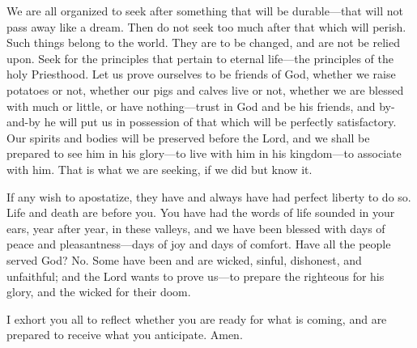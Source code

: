 					We are all organized to seek after something that will be durable---that will not pass away like a dream. Then do not seek too much after that which will perish. Such things belong to the world. They are to be changed, and are not be relied upon. Seek for the principles that pertain to eternal life---the principles of the holy Priesthood. Let us prove ourselves to be friends of God, whether we raise potatoes or not, whether our pigs and calves live or not, whether we are blessed with much or little, or have nothing---trust in God and be his friends, and by-and-by he will put us in possession of that which will be perfectly satisfactory. Our spirits and bodies will be preserved before the Lord, and we shall be prepared to see him in his glory---to live with him in his kingdom---to associate with him. That is what we are seeking, if we did but know it.

					If any wish to apostatize, they have and always have had perfect liberty to do so. Life and death are before you. You have had the words of life sounded in your ears, year after year, in these valleys, and we have been blessed with days of peace and pleasantness---days of joy and days of comfort. Have all the people served God? No. Some have been and are wicked, sinful, dishonest, and unfaithful; and the Lord wants to prove us---to prepare the righteous for his glory, and the wicked for their doom.

					I exhort you all to reflect whether you are ready for what is coming, and are prepared to receive what you anticipate. Amen.
